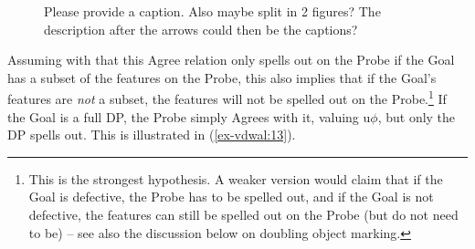 \documentclass[output=paper
,modfonts
,nonflat]{langsci/langscibook}
\begin{document}
\begin{figure}
	\caption{\color{red}Please provide a caption. Also maybe split in 2 figures? The description after the arrows could then be the captions?\label{ex-vdwal:12}}
	\begin{exe}
\end{exe}
\end{figure} 

Assuming with \citet{Roberts2010} that this Agree relation only spells out on the Probe if the Goal has a subset of the features on the Probe, this also implies that if the Goal’s features are \textit{not} a subset, the features will not be spelled out on the Probe.\footnote{This is the strongest hypothesis. A weaker version would claim that if the Goal is defective, the Probe has to be spelled out, and if the Goal is not defective, the features can still be spelled out on the Probe (but do not need to be) -- see also the discussion below on doubling object marking.} If the Goal is a full DP, the Probe simply Agrees with it, valuing u$\phi$, but only the DP spells out. This is illustrated in (\ref{ex-vdwal:13}).
\end{document}
